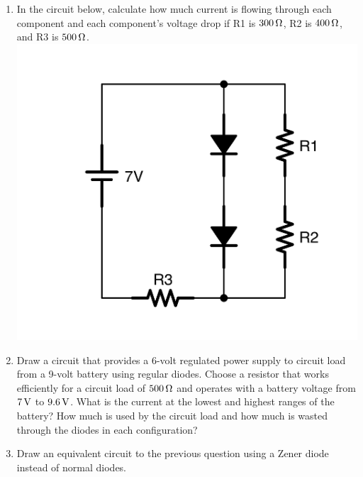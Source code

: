 \begin{enumerate}
\item In the circuit below, calculate how much current is flowing through each component and each component's voltage drop if R1 is $300\,\si{\ohm}$, R2 is $400\,\si{\ohm}$, and R3 is $500\,\si{\ohm}$.  \\ \includegraphics[scale=0.08]{DiodeApplyEx2.png}
\item Draw a circuit that provides a 6-volt regulated power supply to circuit load from a 9-volt battery using regular diodes.  Choose a resistor that works efficiently for a circuit load of $500\,\si{\ohm}$ and operates with a battery voltage from $7\,\si{\volt}$ to $9.6\,\si{\volt}$.  What is the current at the lowest and highest ranges of the battery?  How much is used by the circuit load and how much is wasted through the diodes in each configuration?
\item Draw an equivalent circuit to the previous question using a Zener diode instead of normal diodes.
\end{enumerate}
